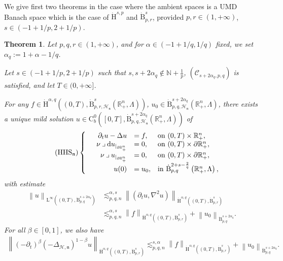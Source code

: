 \documentclass[10pt]{amsart}
\newtheorem{theo}{Theorem}[section]
\theoremstyle{definition}\newtheorem{defi}[theo]{Definition}\newtheorem{rema}[theo]{Remark}\newtheorem{exam}[theo]{Example}\newtheorem{exem}[theo]{Example}\newtheorem{nota}[theo]{Notation}
\newcommand{\bbR}{\mathbb{R}}
\newcommand{\bbN}{\mathbb{N}}
\newcommand{\rmH}{\mathrm{H}}%
\newcommand{\rmB}{\mathrm{B}}
\newcommand{\rmd}{\mathrm{d}}
\newcommand{\rmL}{\mathrm{L}}
\newcommand{\rmC}{\mathrm{C}}
\newcommand{\clH}{\mathcal{H}}
\newcommand{\clC}{\mathcal{C}}
\newcommand{\fkn}{\mathfrak{n}}
\newcommand{\iprod}{\mathbin{\lrcorner}}
\begin{document}
We give first two theorems in the case where the ambient spaces is a UMD Banach space which is the case of $\dot{\rmH}^{s,p}$ and $\dot{\rmB}^{s}_{p,r}$, provided $p,r\in(1,+\infty)$, $s\in(-1+1/p,2+1/p)$.

\begin{theo}\label{thm:MaxRxBesovUMDHodgeStokesRn+}
Let $p,q,r\in(1,+\infty)$, and for $\alpha\in(-1+1/q,1/q)$ fixed, we set $\alpha_q:= 1+\alpha-1/q$.

Let $s\in(-1+1/p,2+1/p)$ such that $s,s+2\alpha_q\notin \bbN +\frac{1}{p}$, $(\clC_{s+2\alpha_q,p,q})$ is satisfied, and let $T\in(0,+\infty]$.

For any $f\in \dot{\rmH}^{\alpha,q}((0,T),\dot{\rmB}^{s}_{p,r,\clH_\fkn}(\bbR^n_+,\Lambda))$, $u_0\in \dot{\rmB}^{s+2\alpha_q}_{p,q,\clH_\fkn}(\bbR^n_+,\Lambda)$, there exists a unique mild solution $u \in \rmC ^0_b([0,T],\dot{\rmB}^{s+2\alpha_q}_{p,q,\clH_\fkn}(\bbR^n_+,\Lambda))$ of
\begin{equation*}
\tag{HHS${}_{\fkn}$}\label{eq:HodgeHeatSystem}
\left\{
\begin{array}{rrll}
&{\partial_t u - \Delta u}  &{= f,} &{\text{on } (0,T)\times\bbR^n_+,}\\
&{\nu\iprod\rmd u_{|_{\partial\bbR^n_+}}} &{=  0,}
&{\text{on } (0,T)\times\partial\bbR^n_+,}\\
&{\nu\iprod u_{|_{\partial\bbR^n_+}}} &{=  0,}
&{\text{on } (0,T)\times\partial\bbR^n_+,}\\
&{u(0)} &{=  u_0,} &{\text{in } \dot{\rmB}^{2+s-\frac{2}{q}}_{p,q}\left(\bbR^n_+,\Lambda\right),}
\end{array}\right.
\end{equation*}
with estimate
\begin{align*}
\left\| u \right\|_{\rmL^\infty((0,T),\dot{\rmB}^{s+2\alpha_q}_{p,q})} &\lesssim_{p,q,n}^{\alpha,s} \left\| \left(\partial_t u, \nabla^2 u\right) \right\|_{\dot{\rmH}^{\alpha,q}\left((0,T),\dot{\rmB}^{s}_{p,r}\right)}\\
&\lesssim_{p,q,n}^{\alpha,s} \left\| f \right\|_{\dot{\rmH}^{\alpha,q}\left((0,T),\dot{\rmB}^{s}_{p,r}\right)}+ \left\| u_0 \right\|_{\dot{\rmB}^{s+2\alpha_q}_{p,q}}.
\end{align*}
For all $\beta\in[0,1]$, we also have
\begin{align}\label{eq:fractionalEstimatePruss1}
\left\| (-\partial_t)^\beta\left(-\Delta_\mathcal{H,\fkn}\right)^{1-\beta} u\right\|_{\dot{\rmH}^{\alpha,q}\left((0,T),\dot{\rmB}^{s}_{p,r}\right)} \lesssim_{p,q,n}^{s,\alpha} \left\| f \right\|_{\dot{\rmH}^{\alpha,q} \left((0,T),\dot{\rmB}^{s}_{p,r}\right)} + \left\| u_0 \right\|_{\dot{\rmB}^{s+2\alpha_q}_{p,q}}.
\end{align}
\end{theo}
\end{document}

